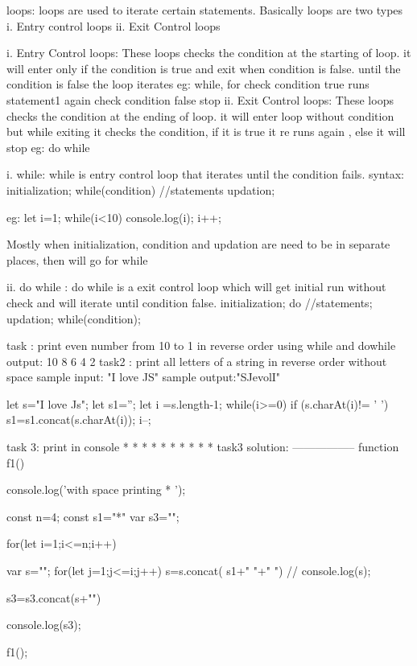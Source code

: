 
loops: loops are used to iterate certain statements. Basically loops are two types
  i. Entry control loops
  ii. Exit Control loops

i. Entry Control loops:
    These loops checks the condition at the starting of loop. it will enter only if the condition is true and exit when condition is false. until the condition is false the loop iterates
    eg: while, for
      check condition
         true
           runs statement1
           again check condition
     false
         stop
ii. Exit Control loops:
    These loops checks the condition at the ending of loop. it will enter loop without condition but while exiting it checks the condition, if it is true it re runs again , else it will stop
   eg: do while

   i. while: while is entry control loop that iterates until the condition fails.
    syntax: initialization;
            while(condition){
                //statements
                updation;
            }

      eg: let i=1;
      while(i<10){
        console.log(i);
        i++;
      }

    Mostly when initialization, condition and updation are need to be in separate places, then will go for while

ii. do while : do while is a exit control loop which will get initial run without check and will iterate until condition false.
     initialization;
      do{
        //statements;
        updation;
      }while(condition);

    task : print even number from 10 to 1 in reverse order using while and dowhile
    output: 10
            8
            6
            4
            2
    task2 : print all letters of a string in reverse order without space
    sample input: "I love JS"
    sample output:"SJevolI"

let s="I love Js";
let s1='';
let i =s.length-1;
while(i>=0){
if (s.charAt(i)!= ' ')
{
s1=s1.concat(s.charAt(i));
}
i--;
}

task 3:
print in console
*
* *
* * *
* * * *
task3 solution:
-----------------
function f1(){
    console.log('with space printing * ');

    const n=4;
    const s1="*"
    var s3="";

    for(let i=1;i<=n;i++)
         {
            var s="";
            for(let j=1;j<=i;j++)
            {
                s=s.concat( s1+" "+" ")
            }
           // console.log(s);
           
            s3=s3.concat(s+"\n")
            
         }
         console.log(s3);
}
f1();



